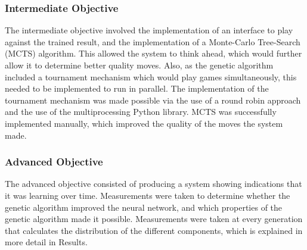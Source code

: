 \documentclass[12pt,a4paper]{article}
\begin{document}
    \subsubsection{Intermediate Objective}
        The intermediate objective involved the implementation of an interface to play against the trained result, and the implementation of a Monte-Carlo Tree-Search (MCTS) algorithm. This allowed the system to think ahead, which would further allow it to determine better quality moves. Also, as the genetic algorithm included a tournament mechanism which would play games simultaneously, this needed to be implemented to run in parallel. The implementation of the tournament mechanism was made possible via the use of a round robin approach and the use of the multiprocessing Python library. MCTS was successfully implemented manually, which improved the quality of the moves the system made.
        
    \subsubsection{Advanced Objective}
        The advanced objective consisted of producing a system showing indications that it was learning over time. Measurements were taken to determine whether the genetic algorithm improved the neural network, and which properties of the genetic algorithm made it possible. Measurements were taken at every generation that calculates the distribution of the different components, which is explained in more detail in Results.
    
\end{document}
